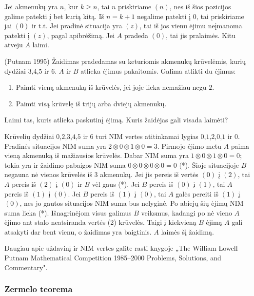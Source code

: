 Jei akmenukų yra $n$, kur $k \geq n$, tai $n$ priskiriame $(n)$, nes iš
šios pozicijos galime patekti į bet kurią kitą. Iš $n=k+1$ negalime patekti
į $0$, tai priskiriame jai $(0)$ ir t.t. Jei pradinė situacija yra $(z)$, tai iš
jos vienu ėjimu neįmanoma patekti į $(z)$, pagal apibrėžimą. Jei $A$ pradeda
$(0)$, tai jis pralaimės. Kitu atveju $A$ laimi.

\begin{pavnr}(Putnam 1995)
  Žaidimas pradedamas su keturiomis akmenukų krūvelėmis, kurių dydžiai
  $3$,$4$,$5$ ir $6$. $A$ ir $B$ atlieka ėjimus pakaitomis. Galima atlikti
  du ėjimus:
  \begin{enumerate}
    \item Paimti vieną akmenuką iš krūvelės, jei joje lieka nemažiau negu $2$.
    \item Paimti visą krūvelę iš trijų arba dviejų akmenukų.
  \end{enumerate}
  Laimi tas, kuris atlieka paskutinį ėjimą. Kuris žaidėjas gali visada laimėti?
\end{pavnr}

Krūvelių dydžiai $0$,$2$,$3$,$4$,$5$ ir $6$ turi NIM vertes atitinkamai
lygias $0$,$1$,$2$,$0$,$1$ ir $0$. Pradinės situacijos NIM suma yra
$2\otimes 0 \otimes 1 \otimes 0=3$. Pirmojo ėjimo metu $A$ paima vieną akmenuką iš mažiausios krūvelės. Dabar
NIM suma yra $1\otimes 0 \otimes 1 \otimes 0=0$; tokia yra ir žaidimo pabaigos NIM suma  $0\otimes 0 \otimes 0\otimes 0=0$ (*).  Šioje situacijoje $B$ negauna nė vienos krūvelės iš $3$ akmenukų. Jei jis pereis iš vertės $(0)$
į $(2)$, tai $A$ pereis iš $(2)$ į $(0)$ ir $B$ vėl gaus (*). Jei
$B$ pereis iš $(0)$ į $(1)$, tai $A$ pereis iš $(1)$ į $(0)$. Jei $B$
pereis iš $(1)$ į $(0)$, tai $A$ galės pereiti iš $(1)$ į $(0)$, nes jo
gautos situacijos NIM suma bus nelyginė. Po abiejų šių ėjimų NIM suma lieka (*). Išnagrinėjom visus galimus $B$
veiksmus, kadangi po nė vieno $A$ ėjimo ant stalo neatsiranda vertės (2)
krūvelės. Taigi į kiekvieną $B$ ėjimą $A$ gali atsakyti dar bent vienu, o
žaidimas yra baigtinis. $A$ laimės šį žaidimą. 

\begin{pastaba}Daugiau apie uždavinį ir NIM vertes galite rasti knygoje „The William Lowell Putnam Mathematical Competition 1985–2000 Problems, Solutions, and Commentary". 
\end{pastaba}

\subsubsection{Zermelo teorema}

